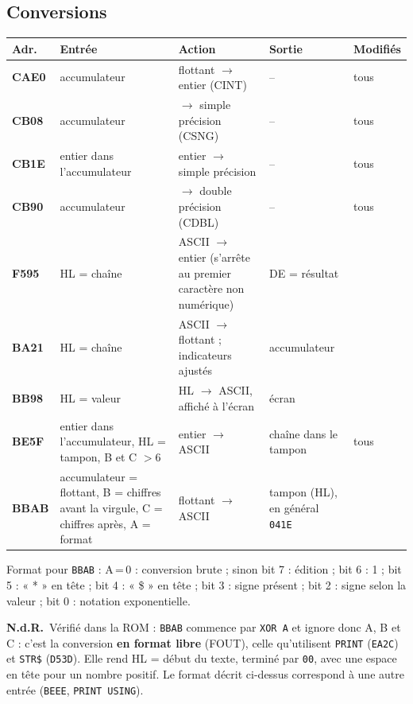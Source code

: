 \documentclass[a4paper,10pt]{article}
\makeatletter
\newcommand{\hex}[1]{\texttt{#1}}
\newcommand{\nota}[1]{\textcolor{red!60!black}{\small\textbf{N.d.R.}~#1}}
\newenvironment{routines}
  {\small\begin{longtable}{@{}>{\ttfamily\bfseries}p{1.1cm}>{\raggedright}p{4.0cm}>{\raggedright}p{5.0cm}>{\raggedright}p{3.1cm}>{\raggedright\arraybackslash}p{2.1cm}@{}}
   \toprule
   \normalfont\bfseries Adr. & \textbf{Entrée} & \textbf{Action} & \textbf{Sortie} & \textbf{Modifiés}\\
   \midrule\endhead
   \bottomrule\endfoot}
  {\end{longtable}}
\makeatother
\begin{document}
\subsection{Conversions}
\begin{routines}
CAE0 & accumulateur & flottant $\to$ entier (CINT) & -- & tous \\
CB08 & accumulateur & $\to$ simple précision (CSNG) & -- & tous \\
CB1E & entier dans l'accumulateur & entier $\to$ simple précision & -- & tous \\
CB90 & accumulateur & $\to$ double précision (CDBL) & -- & tous \\
F595 & HL = chaîne & ASCII $\to$ entier (s'arrête au premier caractère non numérique) & DE = résultat & \\
BA21 & HL = chaîne & ASCII $\to$ flottant ; indicateurs ajustés & accumulateur & \\
BB98 & HL = valeur & HL $\to$ ASCII, affiché à l'écran & écran & \\
BE5F & entier dans l'accumulateur, HL = tampon, B et C $>6$ & entier $\to$ ASCII & chaîne dans le tampon & tous \\
BBAB & accumulateur = flottant, B = chiffres avant la virgule, C = chiffres après, A = format & flottant $\to$ ASCII & tampon (HL), en général \hex{041E} & \\
\end{routines}
Format pour \hex{BBAB} : A\,=\,0 : conversion brute ; sinon bit 7 :
édition ; bit 6 : 1 ; bit 5 : « * » en tête ; bit 4 : « \$ » en tête ;
bit 3 : signe présent ; bit 2 : signe selon la valeur ; bit 0 : notation
exponentielle.

\nota{Vérifié dans la ROM : \hex{BBAB} commence par \texttt{XOR A} et ignore
donc A, B et C : c'est la conversion \textbf{en format libre} (FOUT), celle
qu'utilisent \texttt{PRINT} (\hex{EA2C}) et \texttt{STR\$} (\hex{D53D}). Elle
rend HL = début du texte, terminé par \hex{00}, avec une espace en tête pour
un nombre positif. Le format décrit ci-dessus correspond à une autre entrée
(\hex{BEEE}, \texttt{PRINT USING}).}
\end{document}
